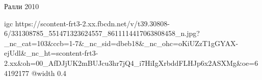  
 
 
 
 

\qqSecCmt


Ралли 2010

\ifcmt
  igc https://scontent-frt3-2.xx.fbcdn.net/v/t39.30808-6/331308785_551471323624557_8611114417063808458_n.jpg?_nc_cat=103&ccb=1-7&_nc_sid=dbeb18&_nc_ohc=oKiUZzT1gGYAX-ejUdl&_nc_ht=scontent-frt3-2.xx&oh=00_AfDJjUK2mBUJcu3hr7jQ4_i7HiIgXrbddFLHJp6x2ASXMg&oe=64192177
	@width 0.4
\fi
